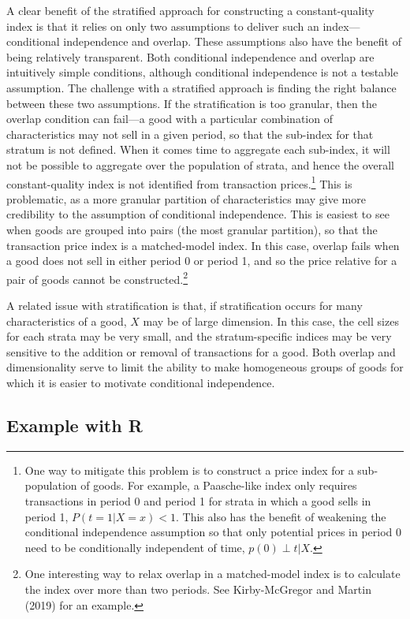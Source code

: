 \documentclass[]{article}
\begin{document}
A clear benefit of the stratified approach for constructing a constant-quality index is that it relies on only two assumptions to deliver such an index---conditional independence and overlap. These assumptions also have the benefit of being relatively transparent. Both conditional independence and overlap are intuitively simple conditions, although conditional independence is not a testable assumption. The challenge with a stratified approach is finding the right balance between these two assumptions. If the stratification is too granular, then the overlap condition can fail---a good with a particular combination of characteristics may not sell in a given period, so that the sub-index for that stratum is not defined. When it comes time to aggregate each sub-index, it will not be possible to aggregate over the population of strata, and hence the overall constant-quality index is not identified from transaction prices.\footnote{One way to mitigate this problem is to construct a price index for a sub-population of goods. For example, a Paasche-like index only requires transactions in period 0 and period 1 for strata in which a good sells in period 1, \(P(t = 1 | X = x) < 1\). This also has the benefit of weakening the conditional independence assumption so that only potential prices in period 0 need to be conditionally independent of time, \(p(0) \perp t | X\).} This is problematic, as a more granular partition of characteristics may give more credibility to the assumption of conditional independence. This is easiest to see when goods are grouped into pairs (the most granular partition), so that the transaction price index is a matched-model index. In this case, overlap fails when a good does not sell in either period 0 or period 1, and so the price relative for a pair of goods cannot be constructed.\footnote{One interesting way to relax overlap in a matched-model index is to calculate the index over more than two periods. See Kirby-McGregor and Martin (2019) for an example.}

A related issue with stratification is that, if stratification occurs for many characteristics of a good, \(X\) may be of large dimension. In this case, the cell sizes for each strata may be very small, and the stratum-specific indices may be very sensitive to the addition or removal of transactions for a good. Both overlap and dimensionality serve to limit the ability to make homogeneous groups of goods for which it is easier to motivate conditional independence.

\hypertarget{example-with-r-2}{%
\subsection{Example with R}\label{example-with-r-2}}
\end{document}
